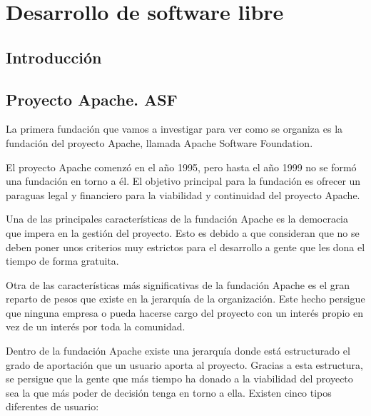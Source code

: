 \chapter{Desarrollo de software libre}
\label{CHAP5:Development}
\section{Introducci\'on}
\section{Proyecto Apache. ASF}
La primera fundaci\'on que vamos a investigar para ver como se organiza es la fundaci\'on del proyecto Apache, llamada Apache Software Foundation.

El proyecto Apache comenz\'o en el año 1995, pero hasta el año 1999 no se form\'o una fundaci\'on en torno a \'el. El objetivo principal para la fundaci\'on es ofrecer un paraguas legal y financiero para la viabilidad y continuidad del proyecto Apache.

Una de las principales caracter\'isticas de la fundaci\'on Apache es la democracia que impera en la gesti\'on del proyecto. Esto es debido a que consideran que no se deben poner unos criterios muy estrictos para el desarrollo a gente que les dona el tiempo de forma gratuita. 

Otra de las caracter\'isticas m\'as significativas de la fundaci\'on Apache es el gran reparto de pesos que existe en la jerarqu\'ia de la organizaci\'on. Este hecho persigue que ninguna empresa o  pueda hacerse cargo del proyecto con un inter\'es propio en vez de un inter\'es por toda la comunidad.

Dentro de la fundaci\'on Apache existe una jerarqu\'ia donde est\'a estructurado el grado de aportaci\'on que un usuario aporta al proyecto. Gracias a esta estructura, se persigue que la gente que m\'as tiempo ha donado a la viabilidad del proyecto sea la que m\'as poder de decisi\'on tenga en torno a ella. Existen cinco tipos diferentes de usuario:


